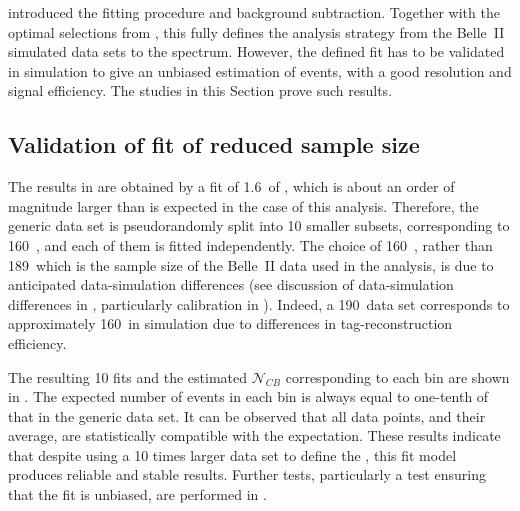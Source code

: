  introduced the fitting procedure and \BB background subtraction.
Together with the optimal selections from , this fully defines the analysis strategy from the Belle~II simulated data sets to the \BtoXsgamma spectrum.
However, the defined fit has to be validated in simulation to give an unbiased estimation of \BtoXsgamma events, with a good resolution and signal efficiency.
The studies in this Section prove such results.

\subsection{Validation of \texorpdfstring{\Mbc}{Mbc} fit of reduced sample size}\label{sec:mbc_fit_validation_misreconstructed}

The results in  are obtained by a fit of 1.6~\invab of \MC, which is about an order of magnitude larger than is expected in the case of this analysis.
Therefore, the generic \MC data set is pseudorandomly split into 10 smaller subsets, corresponding to 160~\invfb, and each of them is fitted independently.
The choice of 160~\invfb, rather than 189~\invfb which is the sample size of the Belle~II data used in the analysis, 
is due to anticipated data-simulation differences (see discussion of data-simulation differences in , particularly \FEI calibration in ).
Indeed, a 190~\invfb data set corresponds to approximately 160~\invfb in simulation due to differences in tag-\B reconstruction efficiency.

The resulting 10 fits and the estimated $\mathcal{N}_{CB}$ corresponding to each \EB bin are shown in .
The expected number of events in each bin is always equal to one-tenth of that in the generic \MC data set.
It can be observed that all data points, and their average, are statistically compatible with the expectation.
These results indicate that despite using a 10 times larger data set to define the , this \Mbc fit model produces reliable and stable results.
Further tests, particularly a test ensuring that the fit is unbiased, are performed in .

